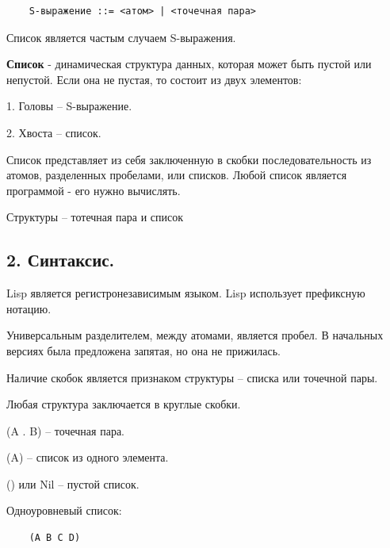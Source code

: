 \begin{lstlisting}
	S-выражение ::= <атом> | <точечная пара>
\end{lstlisting}

Список является частым случаем S-выражения.



\textbf{Список} - динамическая структура данных, которая может быть пустой или непустой. Если она не пустая, то состоит из двух элементов:

1. Головы -- S-выражение.

2. Хвоста -- список.

Список представляет из себя заключенную в скобки
последовательность из атомов, разделенных пробелами, или списков.
Любой список является программой - его нужно вычислять.



Структуры -- тотечная пара и список


\subsection*{2. Синтаксис.}

Lisp является регистронезависимым языком. Lisp использует префиксную нотацию.

Универсальным разделителем, между атомами, является пробел. В начальных версиях была предложена запятая, но она не прижилась.

Наличие скобок является признаком структуры -- списка или точечной пары.


Любая структура заключается в круглые скобки.

(A . B) -- точечная пара.

(A) -- список из одного элемента.

() или Nil -- пустой список.

Одноуровневый список:
\begin{lstlisting}
	(A B C D)
\end{lstlisting}

